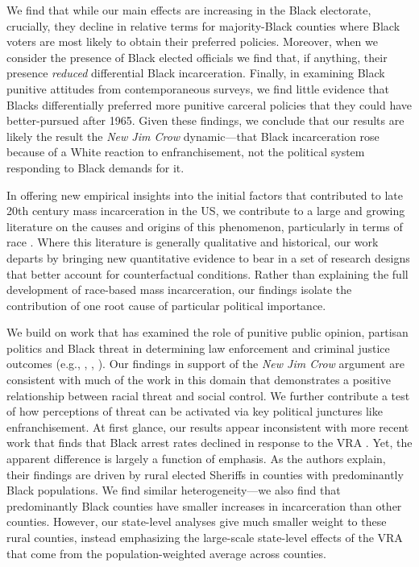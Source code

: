 \documentclass[12pt]{article}
\begin{document}
We find that while our main effects are increasing in the Black electorate, crucially, they decline in relative terms for majority-Black counties where Black voters are most likely to obtain their preferred policies.  Moreover, when we consider the presence of Black elected officials we find that, if anything, their presence \emph{reduced} differential Black incarceration.  Finally, in examining Black punitive attitudes from contemporaneous surveys, we find little evidence that Blacks differentially preferred more punitive carceral policies that they could have better-pursued after 1965. Given these findings, we conclude that our results are likely the result the \emph{New Jim Crow} dynamic---that Black incarceration rose because of a White reaction to enfranchisement, not the political system responding to Black demands for it.

In offering new empirical insights into the initial factors that contributed to late 20th century mass incarceration in the US, we contribute to a large and growing literature on the causes and origins of this phenomenon, particularly in terms of race \citep{Gottschalk:2006ub,Alexander:2012tj,Murakawa:2014vj,Hinton:2016tb,Pfaff:2017tp,Gottschalk:2008um,Soss:2017wx,Beckett:2020cw}.  Where this literature is generally qualitative and historical, our work departs by bringing new quantitative evidence to bear in a set of research designs that better account for counterfactual conditions.  Rather than explaining the full development of race-based mass incarceration, our findings isolate the contribution of one root cause of particular political importance.

We build on work that has examined the role of punitive public opinion, partisan politics and Black threat in determining law enforcement and criminal justice outcomes (e.g., \cite{Jacobs:1996wi} \cite{Fording:2001vz}, \cite{Yates:2005th}, \cite{Enns:2015vz}). Our findings in support of the \emph{New Jim Crow} argument are consistent with much of the work in this domain that demonstrates a positive relationship between racial threat and social control. We further contribute a test of how perceptions of threat can be activated via key political junctures like enfranchisement. At first glance, our results appear inconsistent with more recent work that finds that Black arrest rates declined in response to the VRA \citep{Facchini:2020tb}.  Yet, the apparent difference is largely a function of emphasis.  As the authors explain, their findings are driven by rural elected Sheriffs in counties with predominantly Black populations. We find similar heterogeneity---we also find that predominantly Black counties have smaller increases in incarceration than other counties.  However, our state-level analyses give much smaller weight to these rural counties, instead emphasizing the large-scale state-level effects of the VRA that come from the population-weighted average across counties.
\end{document}
